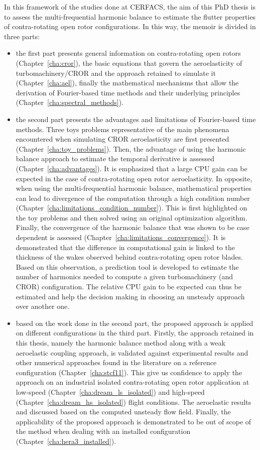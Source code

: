 In this framework of the studies done at CERFACS,
the aim of this PhD thesis is to assess the
multi-frequential harmonic balance
to estimate the flutter properties of contra-rotating open rotor
configurations. In this way, the memoir is divided in three parts:
\begin{itemize}
	\item the first part presents general information on 
	contra-rotating open rotors (Chapter~\ref{cha:cror}),
	the basic equations that govern the aeroelasticity of
	turbomachinery/CROR and the approach retained to simulate it
	(Chapter~\ref{cha:ael}),
	finally the mathematical mechanisms that allow the derivation
	of Fourier-based time methods and their underlying principles
	(Chapter~\ref{cha:spectral_methods}).
	\item the second part presents the advantages and limitations
	of Fourier-based time methods. Three toys problems representative
	of the main phenomena encountered when simulating CROR
	aeroelasticity are first presented (Chapter~\ref{cha:toy_problems}).
	Then, the advantage of using the harmonic balance 
	approach to estimate the temporal derivative is assessed
	(Chapter~\ref{cha:advantages}). It is emphasized
	that a large CPU gain can be expected in the
	case of contra-rotating open rotor aeroelasticity. 
	In opposite, when using the multi-frequential harmonic
	balance, mathematical properties can lead to divergence
	of the computation through a high condition number
	(Chapter~\ref{cha:limitations_condition_number}). This is 
	first highlighted on the toy problems and then solved using
	an original optimization algorithm.
	Finally, the convergence of the harmonic balance 
	that was shown to be case dependent is
	assessed (Chapter~\ref{cha:limitations_convergence}). 
	It is demonstrated that the difference in computational
	gain is linked to the thickness of the wakes observed behind
	contra-rotating open rotor blades. Based on this observation,
	a prediction tool is developed to estimate the
	number of harmonics needed to compute a given turbomachinery (and CROR)
	configuration. The relative CPU gain to be expected can thus be estimated
	and help the decision making in choosing an unsteady approach
	over another one.
	\item based on the work done in the second part,
	the proposed approach is applied on different configurations
	in the third part. Firstly, the approach retained in this thesis, 
	namely the harmonic balance method along with a weak 
	aeroelastic coupling approach, is validated against experimental 
	results and other numerical approaches found in the
	literature on a reference configuration 
	(Chapter~\ref{cha:stcf11}). This give us confidence
	to apply the approach on an industrial isolated contra-rotating
	open rotor application at low-speed (Chapter~\ref{cha:dream_ls_isolated})
	and high-speed (Chapter~\ref{cha:dream_hs_isolated})
	flight conditions. The aeroelastic results and discussed based
	on the computed unsteady flow field. Finally, the applicability
	of the proposed approach is demonstrated to be out of scope
	of the method when dealing with an installed configuration 
	(Chapter~\ref{cha:hera3_installed}).
\end{itemize}
